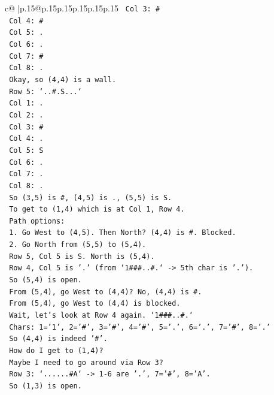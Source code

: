 \documentclass{article}
\begin{document}
{\begin{supertabular}{c@{$\;$}|p{.15\linewidth}@{}p{.15\linewidth}p{.15\linewidth}p{.15\linewidth}p{.15\linewidth}p{.15\linewidth}}
{{{\texttt{  Col 3: \#} \\
\texttt{  Col 4: \#} \\
\texttt{  Col 5: .} \\
\texttt{  Col 6: .} \\
\texttt{  Col 7: \#} \\
\texttt{  Col 8: .} \\
\texttt{  Okay, so (4,4) is a wall.} \\
\texttt{  Row 5: `..\#.S...`} \\
\texttt{  Col 1: .} \\
\texttt{  Col 2: .} \\
\texttt{  Col 3: \#} \\
\texttt{  Col 4: .} \\
\texttt{  Col 5: S} \\
\texttt{  Col 6: .} \\
\texttt{  Col 7: .} \\
\texttt{  Col 8: .} \\
\texttt{  So (3,5) is \#, (4,5) is ., (5,5) is S.} \\
\texttt{  To get to (1,4) which is at Col 1, Row 4.} \\
\texttt{  Path options:} \\
\texttt{  1. Go West to (4,5). Then North? (4,4) is \#. Blocked.} \\
\texttt{  2. Go North from (5,5) to (5,4).} \\
\texttt{     Row 5, Col 5 is S. North is (5,4).} \\
\texttt{     Row 4, Col 5 is '.' (from `1\#\#\#..\#.` {-}> 5th char is '.').} \\
\texttt{     So (5,4) is open.} \\
\texttt{     From (5,4), go West to (4,4)? No, (4,4) is \#.} \\
\texttt{     From (5,4), go West to (4,4) is blocked.} \\
\texttt{     Wait, let's look at Row 4 again. `1\#\#\#..\#.`} \\
\texttt{     Chars: 1='1', 2='\#', 3='\#', 4='\#', 5='.', 6='.', 7='\#', 8='.'} \\
\texttt{     So (4,4) is indeed '\#'.} \\
\texttt{     How do I get to (1,4)?} \\
\texttt{     Maybe I need to go around via Row 3?} \\
\texttt{     Row 3: `......\#A` {-}> 1{-}6 are '.', 7='\#', 8='A'.} \\
\texttt{     So (1,3) is open.} \\
}}}
\end{supertabular}}
\end{document}
